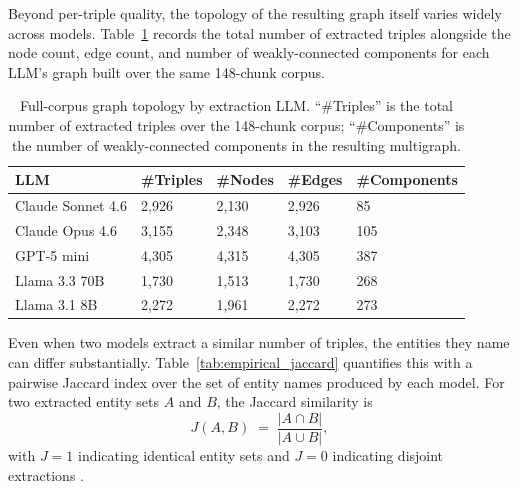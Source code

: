 \documentclass[12pt,a4paper,oneside]{report}
\begin{document}
Beyond per-triple quality, the topology of the resulting graph itself
varies widely across models. Table~\ref{tab:empirical_topology} records
the total number of extracted triples alongside the node count, edge
count, and number of weakly-connected components for each LLM's graph
built over the same 148-chunk corpus.

\begin{table}[htbp]
\centering
\caption{Full-corpus graph topology by extraction LLM. ``\#Triples'' is
the total number of extracted triples over the 148-chunk corpus;
``\#Components'' is the number of weakly-connected components in the
resulting multigraph.}
\label{tab:empirical_topology}
\small
\begin{tabularx}{\textwidth}{@{}lXXXX@{}}
\toprule
\textbf{LLM} & \textbf{\#Triples} & \textbf{\#Nodes} & \textbf{\#Edges} & \textbf{\#Components} \\
\midrule
Claude Sonnet 4.6 & 2,926 & 2,130 & 2,926 & 85 \\
Claude Opus 4.6   & 3,155 & 2,348 & 3,103 & 105 \\
GPT-5 mini        & 4,305 & 4,315 & 4,305 & 387 \\
Llama 3.3 70B     & 1,730 & 1,513 & 1,730 & 268 \\
Llama 3.1 8B      & 2,272 & 1,961 & 2,272 & 273 \\
\bottomrule
\end{tabularx}
\end{table}

Even when two models extract a similar number of triples, the entities
they name can differ substantially. Table~\ref{tab:empirical_jaccard}
quantifies this with a pairwise Jaccard index over the set of entity
names produced by each model. For two extracted entity sets $A$ and
$B$, the Jaccard similarity is
\begin{equation}
    J(A, B) \;=\; \frac{\lvert A \cap B \rvert}{\lvert A \cup B \rvert},
    \label{eq:jaccard}
\end{equation}
with $J = 1$ indicating identical entity sets and $J = 0$ indicating
disjoint extractions \citep{erickson2025}.
\end{document}
